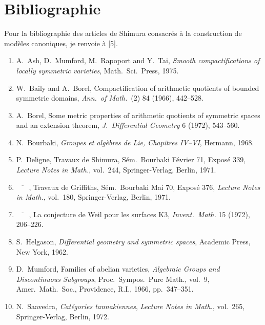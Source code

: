 \documentclass[12pt,a4paper]{article}
\theoremstyle{plain}
\theoremstyle{definition}
\theoremstyle{remark}
\begin{document}
\section*{Bibliographie}

Pour la bibliographie des articles de Shimura consacr\'es \`a la construction de mod\`eles canoniques, je renvoie \`a [5].

\begin{enumerate}[label=\arabic*., leftmargin=*]
\item A.~Ash, D.~Mumford, M.~Rapoport and Y.~Tai, \textit{Smooth compactifications of locally symmetric varieties}, Math.~Sci.~Press, 1975.

\item W.~Baily and A.~Borel, Compactification of arithmetic quotients of bounded symmetric domains, \textit{Ann.~of Math.}~(2) 84 (1966), 442--528.

\item A.~Borel, Some metric properties of arithmetic quotients of symmetric spaces and an extension theorem, \textit{J.~Differential Geometry} 6 (1972), 543--560.

\item N.~Bourbaki, \textit{Groupes et alg\`ebres de Lie, Chapitres IV--VI}, Hermann, 1968.

\item P.~Deligne, Travaux de Shimura, S\'em.~Bourbaki F\'evrier 71, Expos\'e 339, \textit{Lecture Notes in Math.}, vol.~244, Springer-Verlag, Berlin, 1971.

\item $\overline{\phantom{mm}}$, Travaux de Griffiths, S\'em.~Bourbaki Mai 70, Expos\'e 376, \textit{Lecture Notes in Math.}, vol.~180, Springer-Verlag, Berlin, 1971.

\item $\overline{\phantom{mm}}$, La conjecture de Weil pour les surfaces K3, \textit{Invent.~Math.} 15 (1972), 206--226.

\item S.~Helgason, \textit{Differential geometry and symmetric spaces}, Academic Press, New York, 1962.

\item D.~Mumford, Families of abelian varieties, \textit{Algebraic Groups and Discontinuous Subgroups}, Proc.~Sympos.~Pure Math., vol.~9, Amer.~Math.~Soc., Providence, R.I., 1966, pp.~347--351.

\item N.~Saavedra, \textit{Cat\'egories tannakiennes}, \textit{Lecture Notes in Math.}, vol.~265, Springer-Verlag, Berlin, 1972.


\end{enumerate}
\end{document}
